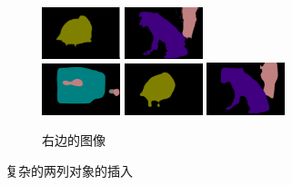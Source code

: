 \begin{figure}[h!]
\begin{subfigure}{0.4\textwidth}
		\includegraphics[width=0.25\textwidth]{image/result/compare/deeplab_bird.png}
		\includegraphics[width=0.25\textwidth]{image/result/compare/deeplab_dog.png} \\
		\includegraphics[width=0.25\textwidth]{image/result/compare/my_bus.png}
		\includegraphics[width=0.25\textwidth]{image/result/compare/my_bird.png}
		\includegraphics[width=0.25\textwidth]{image/result/compare/my_dog.png} 
		\caption{右边的图像}
		\label{fig:compare2}
	\end{subfigure}
	\caption{复杂的两列对象的插入}
	\label{fig:complex}
\end{figure}
